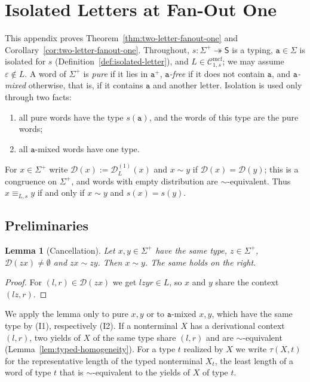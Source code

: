 \documentclass[11pt]{article}
\numberwithin{equation}{section}
\theoremstyle{plain}
\newtheorem{lemma}[theorem]{Lemma}
\theoremstyle{definition}
\theoremstyle{remark}
\newcommand{\Cmcf}[2]{\mathcal{C}^{\mathrm{mcf}}_{#1,#2}}
\newcommand{\D}{\mathcal{D}}
\newcommand{\eps}{\varepsilon}
\theoremstyle{plain}
\begin{document}
\section{Isolated Letters at Fan-Out One}
\label{app:two-letter-fanout-one}

This appendix proves Theorem~\ref{thm:two-letter-fanout-one} and
Corollary~\ref{cor:two-letter-fanout-one}.  Throughout,
$s:\Sigma^+\twoheadrightarrow\mathsf S$ is a typing, $\mathtt a\in\Sigma$ is isolated
for $s$ (Definition~\ref{def:isolated-letter}), and $L\in\Cmcf{1}{s}$; we may
assume $\eps\notin L$.  A word of $\Sigma^+$ is \emph{pure} if it lies in
$\mathtt a^+$, \emph{$\mathtt a$-free} if it does not contain $\mathtt a$, and
\emph{$\mathtt a$-mixed} otherwise, that is, if it contains $\mathtt a$ and another
letter.  Isolation is used only through two facts:
\begin{enumerate}[label=\textup{(I\arabic*)},leftmargin=*]
\item all pure words have the type $s(\mathtt a)$, and the words of this type are
the pure words;
\item all $\mathtt a$-mixed words have one type.
\end{enumerate}
For $x\in\Sigma^+$ write $\D(x):=\D^{(1)}_L(x)$ and $x\sim y$ if
$\D(x)=\D(y)$; this is a congruence on $\Sigma^+$, and words with empty
distribution are $\sim$-equivalent.  Thus $x\equiv_{L,s}y$ if and only if
$x\sim y$ and $s(x)=s(y)$.

\subsection{Preliminaries}

\begin{lemma}[Cancellation]
\label{lem:app-h-cancel}
Let $x,y\in\Sigma^+$ have the same type, $z\in\Sigma^+$, $\D(zx)\ne\emptyset$
and $zx\sim zy$.  Then $x\sim y$.  The same holds on the right.
\end{lemma}

\begin{proof}
For $(l,r)\in\D(zx)$ we get $lzyr\in L$, so $x$ and $y$ share the context
$(lz,r)$.
\end{proof}

We apply the lemma only to pure $x,y$ or to $\mathtt a$-mixed $x,y$, which have
the same type by (I1), respectively (I2).  If a nonterminal $X$ has a
derivational context $(l,r)$, two yields of $X$ of the same type share $(l,r)$
and are $\sim$-equivalent (Lemma~\ref{lem:typed-homogeneity}).  For a type $t$
realized by $X$ we write $\tau(X,t)$ for the representative length of the typed
nonterminal $X_t$, the least length of a word of type $t$ that is
$\sim$-equivalent to the yields of $X$ of type $t$.
\end{document}
